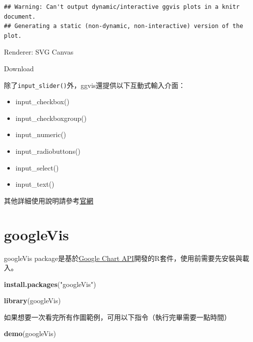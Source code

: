\documentclass[]{book}
\newenvironment{Shaded}{\begin{snugshade}}{\end{snugshade}}
\newcommand{\KeywordTok}[1]{\textcolor[rgb]{0.13,0.29,0.53}{\textbf{{#1}}}}
\newcommand{\StringTok}[1]{\textcolor[rgb]{0.31,0.60,0.02}{{#1}}}
\newcommand{\NormalTok}[1]{{#1}}
\providecommand{\tightlist}{%
  \setlength{\itemsep}{0pt}\setlength{\parskip}{0pt}}
\theoremstyle{definition}
\theoremstyle{definition}
\theoremstyle{remark}
\begin{document}
\begin{verbatim}
## Warning: Can't output dynamic/interactive ggvis plots in a knitr document.
## Generating a static (non-dynamic, non-interactive) version of the plot.
\end{verbatim}

\hypertarget{plot_id511182544-container}{}
\hypertarget{plot_id511182544}{}

Renderer: SVG \textbar{} Canvas

Download

除了\texttt{input\_slider()}外，ggvis還提供以下互動式輸入介面：

\begin{itemize}
\tightlist
\item
  input\_checkbox()
\item
  input\_checkboxgroup()
\item
  input\_numeric()
\item
  input\_radiobuttons()
\item
  input\_select()
\item
  input\_text()
\end{itemize}

其他詳細使用說明請參考\href{http://ggvis.rstudio.com/}{官網}

\section{googleVis}\label{googlevis}

googleVis\citep{R-googleVis}
package是基於\href{https://developers.google.com/chart/interactive/docs/}{Google
Chart API}開發的R套件，使用前需要先安裝與載入。

\begin{Shaded}
\begin{Highlighting}[]
\KeywordTok{install.packages}\NormalTok{(}\StringTok{"googleVis"}\NormalTok{)}
\end{Highlighting}
\end{Shaded}

\begin{Shaded}
\begin{Highlighting}[]
\KeywordTok{library}\NormalTok{(googleVis)}
\end{Highlighting}
\end{Shaded}

如果想要一次看完所有作圖範例，可用以下指令（執行完畢需要一點時間）

\begin{Shaded}
\begin{Highlighting}[]
\KeywordTok{demo}\NormalTok{(googleVis)}
\end{Highlighting}
\end{Shaded}
\end{document}
